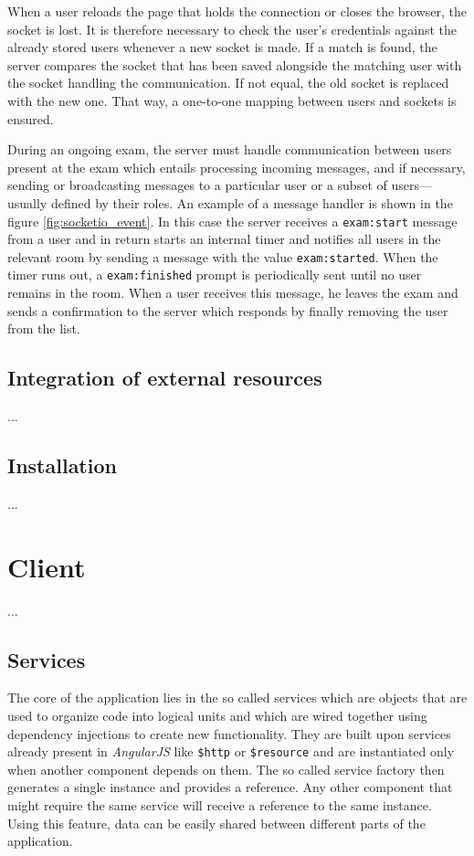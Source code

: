 \documentclass[thesis=M,english,hidelinks]{FITthesis}[2012/10/20]
\newcommand{\code}{\texttt}
\begin{document}
When a user reloads the page that holds the connection or closes the browser, the socket is lost. It is therefore necessary to check the user's credentials against the already stored users whenever a new socket is made. If a match is found, the server compares the socket that has been saved alongside the matching user with the socket handling the communication. If not equal, the old socket is replaced with the new one. That way, a one-to-one mapping between users and sockets is ensured.

During an ongoing exam, the server must handle communication between users present at the exam which entails processing incoming messages, and if necessary, sending or broadcasting messages to a particular user or a subset of users---usually defined by their roles. An example of a message handler is shown in the figure \ref{fig:socketio_event}. In this case the server receives a \code{exam:start} message from a user and in return starts an internal timer and notifies all users in the relevant room by sending a message with the value \code{exam:started}. When the timer runs out, a \code{exam:finished} prompt is periodically sent until no user remains in the room. When a user receives this message, he leaves the exam and sends a confirmation to the server which responds by finally removing the user from the list.





    \subsection{Integration of external resources}

    ...

    \subsection{Installation}

    ...

\section{Client}

  ...

  \subsection{Services}

The core of the application lies in the so called services which are objects that are used to organize code into logical units and which are wired together using dependency injections to create new functionality. They are built upon services already present in \textit{AngularJS} like \code{\$http} or \code{\$resource}  and are instantiated only when another component depends on them. The so called service factory then generates a single instance and provides a reference. Any other component that might require the same service will receive a reference to the same instance. Using this feature, data can be easily shared between different parts of the application.
\end{document}
